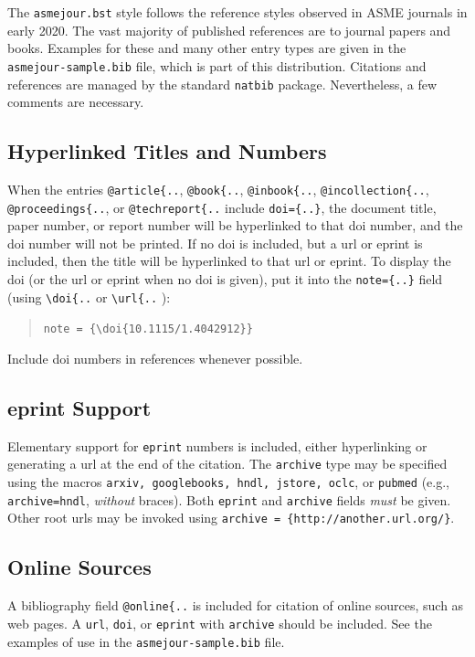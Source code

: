\documentclass[largesc,upint,varvw,barcolor=Red4,nocopyright,hyphenate,balance,lang-second=french,lang=english]{asmejour}
\begin{document}
The {\upshape\texttt{asmejour.bst}}  style follows the reference styles observed in ASME journals in early 2020. The vast majority of published references are to journal papers and books. Examples for these and many other entry types are given in the \texttt{asmejour-sample.bib} file, which is part of this distribution. Citations and references are managed by the standard \texttt{natbib} package.
Nevertheless, a few comments are necessary. 

\subsection{Hyperlinked Titles and Numbers} When the entries \verb|@article{..|, \verb|@book{..|, \verb|@inbook{..|, \verb|@incollection{..|, \verb|@proceedings{..|, or \verb|@techreport{..| include \verb|doi={..}|, the document title, paper number, or report number will be hyperlinked to that doi number, and the doi number will not be printed. If no doi is included, but a url or eprint is included, then the title will be hyperlinked to that url or eprint. To display the doi (or the url or eprint when no doi is given), put it into the \verb|note={..}| field (using \verb|\doi{..| or \verb|\url{..| ):
\begin{quote}
\verb|note = {\doi{10.1115/1.4042912}}|
\end{quote}
Include doi numbers in references whenever possible.

\subsection{eprint Support} Elementary support for \texttt{eprint} numbers is included, either hyperlinking or generating a url at the end of the citation. The \texttt{archive} type may be specified using the macros \texttt{arxiv, googlebooks, hndl, jstore, oclc}, or \texttt{pubmed} (e.g., \texttt{archive=hndl},  \textit{without} braces). Both \texttt{eprint} and \texttt{archive} fields \textit{must} be given. Other root urls may be invoked using \verb|archive = {http://another.url.org/}|.

\subsection{Online Sources} A bibliography field \verb|@online{..| is included for citation of online sources, such as web pages. A \texttt{url}, \texttt{doi}, or \texttt{eprint} with \texttt{archive} should be included. See the examples of use in the \texttt{asmejour-sample.bib} file. 
\end{document}
